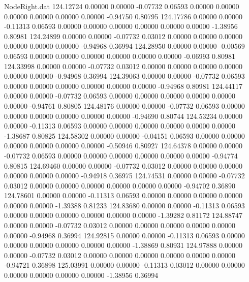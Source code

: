\begin{filecontents}{NodeRight.dat}
 124.12724    0.00000    0.00000    -0.07732    0.06593    0.00000    0.00000    0.00000    0.00000    0.00000    0.00000   -0.94750    0.80795
 124.17786    0.00000    0.00000    -0.11313    0.06593    0.00000    0.00000    0.00000    0.00000    0.00000    0.00000   -1.38956    0.80981
 124.24899    0.00000    0.00000    -0.07732    0.03012    0.00000    0.00000    0.00000    0.00000    0.00000    0.00000   -0.94968    0.36994
 124.28950    0.00000    0.00000    -0.00569    0.06593    0.00000    0.00000    0.00000    0.00000    0.00000    0.00000   -0.06993    0.80981
 124.33998    0.00000    0.00000    -0.07732    0.03012    0.00000    0.00000    0.00000    0.00000    0.00000    0.00000   -0.94968    0.36994
 124.39063    0.00000    0.00000    -0.07732    0.06593    0.00000    0.00000    0.00000    0.00000    0.00000    0.00000   -0.94968    0.80981
 124.44117    0.00000    0.00000    -0.07732    0.06593    0.00000    0.00000    0.00000    0.00000    0.00000    0.00000   -0.94761    0.80805
 124.48176    0.00000    0.00000    -0.07732    0.06593    0.00000    0.00000    0.00000    0.00000    0.00000    0.00000   -0.94690    0.80744
 124.53234    0.00000    0.00000    -0.11313    0.06593    0.00000    0.00000    0.00000    0.00000    0.00000    0.00000   -1.38687    0.80825
 124.58302    0.00000    0.00000    -0.04151    0.06593    0.00000    0.00000    0.00000    0.00000    0.00000    0.00000   -0.50946    0.80927
 124.64378    0.00000    0.00000    -0.07732    0.06593    0.00000    0.00000    0.00000    0.00000    0.00000    0.00000   -0.94774    0.80815
 124.69460    0.00000    0.00000    -0.07732    0.03012    0.00000    0.00000    0.00000    0.00000    0.00000    0.00000   -0.94918    0.36975
 124.74531    0.00000    0.00000    -0.07732    0.03012    0.00000    0.00000    0.00000    0.00000    0.00000    0.00000   -0.94702    0.36890
 124.78601    0.00000    0.00000    -0.11313    0.06593    0.00000    0.00000    0.00000    0.00000    0.00000    0.00000   -1.39388    0.81233
 124.83680    0.00000    0.00000    -0.11313    0.06593    0.00000    0.00000    0.00000    0.00000    0.00000    0.00000   -1.39282    0.81172
 124.88747    0.00000    0.00000    -0.07732    0.03012    0.00000    0.00000    0.00000    0.00000    0.00000    0.00000   -0.94968    0.36994
 124.92815    0.00000    0.00000    -0.11313    0.06593    0.00000    0.00000    0.00000    0.00000    0.00000    0.00000   -1.38869    0.80931
 124.97888    0.00000    0.00000    -0.07732    0.03012    0.00000    0.00000    0.00000    0.00000    0.00000    0.00000   -0.94721    0.36898
 125.03991    0.00000    0.00000    -0.11313    0.03012    0.00000    0.00000    0.00000    0.00000    0.00000    0.00000   -1.38956    0.36994

\end{filecontents}
